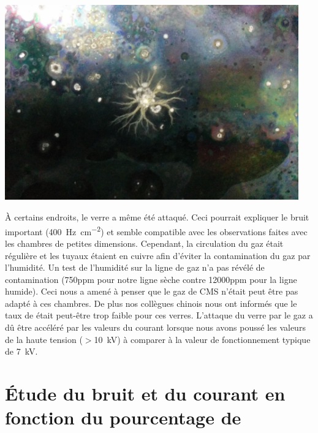 \begin{minipage}[th!]{1\textwidth}
\begin{minipage}[th!]{0.48\textwidth}
\begin{minipage}[th!]{1\textwidth}
			\label{perle}
		\end{minipage}%
		\\
		\begin{minipage}[th!]{1\textwidth}
			\noindent
			\centering
			\includegraphics[width=0.95\textwidth]{GLA/depot2.jpg}
			\label{depot2}
		\end{minipage}%
	\end{minipage}%
	\label{probs}
\end{minipage}%

 À certains endroits, le verre a même été attaqué. Ceci pourrait expliquer le bruit important (\SI{400}{\hertz\per\square\centi\meter}) et semble compatible avec les observations faites avec les chambres de petites dimensions. Cependant, la circulation du gaz était régulière et les tuyaux étaient en cuivre afin d'éviter la contamination du gaz par l'humidité. Un test de l'humidité sur la ligne de gaz n'a pas révélé de contamination (\num{750}ppm pour notre ligne sèche contre \num{12000}ppm pour la ligne humide). Ceci nous a amené à penser que le gaz de CMS n'était peut être pas adapté à ces chambres. De plus nos collègues chinois nous ont informés que le taux de  était peut-être trop faible pour ces verres. L'attaque du verre par le gaz a dû être accéléré par les valeurs du courant lorsque nous avons poussé les valeurs de la haute tension ($>$\SI{10}{\kilo\volt}) à comparer à la valeur de fonctionnement typique de \SI{7}{\kilo\volt}.
 
 \section{Étude du bruit et du courant en fonction du pourcentage de \texorpdfstring{}{SF6}}
 
